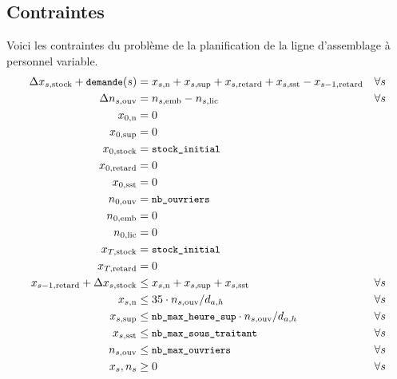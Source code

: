 \subsection*{Contraintes}
Voici les contraintes du problème de la planification 
de la ligne d’assemblage à personnel variable.
\begin{align*}
  \Delta x_{s,\text{stock}} + {\small\texttt{demande}}(s) &= x_{s,\text{n}} + x_{s,\text{sup}} 
  + x_{s,\text{retard}} + x_{s,\text{sst}} - x_{s-1,\text{retard}} &\forall s \\
  \Delta n_{s,\text{ouv}} &= n_{s,\text{emb}} - n_{s,\text{lic}} &\forall s \\
  x_{0,\text{n}}&= 0 \\
  x_{0,\text{sup}}&= 0 \\
  x_{0,\text{stock}}&= {\small\texttt{stock\_initial}} \\
  x_{0,\text{retard}}&= 0 \\
  x_{0,\text{sst}}&= 0 \\
  n_{0,\text{ouv}}&= {\small\texttt{nb\_ouvriers}} \\
  n_{0,\text{emb}}&= 0 \\
  n_{0,\text{lic}}&= 0 \\
  x_{T,\text{stock}}&= {\small\texttt{stock\_initial}} \\
  x_{T,\text{retard}}&= 0 \\
  x_{s-1,\text{retard}} + \Delta x_{s,\text{stock}} &\leq x_{s,\text{n}} + x_{s,\text{sup}} + x_{s,\text{sst}} &\forall s \\
  x_{s,\text{n}} &\leq 35\cdot n_{s,\text{ouv}} / d_{a,h}
  &\forall s \\
  x_{s,\text{sup}} &\leq {\small\texttt{nb\_max\_heure\_sup}}\cdot n_{s,\text{ouv}} / d_{a,h}
  &\forall s \\
  x_{s,\text{sst}} &\leq {\small\texttt{nb\_max\_sous\_traitant}} &\forall s \\
  n_{s,\text{ouv}} &\leq {\small\texttt{nb\_max\_ouvriers}}  &\forall s \\
  x_s, n_s&\geq 0 &\forall s
\end{align*}

